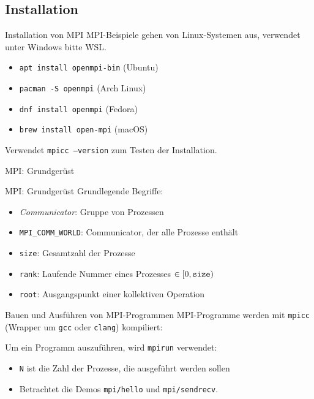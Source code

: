 \documentclass{beamer}
\begin{document}
\subsection{Installation}

\begin{frame}{Installation von MPI}
	MPI-Beispiele gehen von Linux-Systemen aus, verwendet unter Windows bitte WSL.

	\begin{itemize}
		\item \texttt{apt install openmpi-bin} (Ubuntu)
		\item \texttt{pacman -S openmpi} (Arch Linux)
		\item \texttt{dnf install openmpi} (Fedora)
                \item \texttt{brew install open-mpi} (macOS)
	\end{itemize}

	Verwendet \texttt{mpicc --version} zum Testen der Installation.
\end{frame}

\begin{frame}{MPI: Grundgerüst}
\end{frame}

\begin{frame}{MPI: Grundgerüst}
  Grundlegende Begriffe:

  \begin{itemize}
    \item \emph{Communicator}: Gruppe von Prozessen
    \item \texttt{MPI\_COMM\_WORLD}: Communicator, der alle Prozesse enthält
    \item \texttt{size}: Gesamtzahl der Prozesse
    \item \texttt{rank}: Laufende Nummer eines Prozesses $\in [0, \text{\texttt{size}})$
    \item \texttt{root}: Ausgangspunkt einer kollektiven Operation
  \end{itemize}
\end{frame}

\begin{frame}{Bauen und Ausführen von MPI-Programmen}
        MPI-Programme werden mit \texttt{mpicc} (Wrapper um \texttt{gcc} oder \texttt{clang}) kompiliert:


	Um ein Programm auszuführen, wird \texttt{mpirun} verwendet:


	\begin{itemize}
		\item \texttt{N} ist die Zahl der Prozesse, die ausgeführt werden sollen
                \item Betrachtet die Demos \texttt{mpi/hello} und \texttt{mpi/sendrecv}.
	\end{itemize}
\end{frame}
\end{document}
